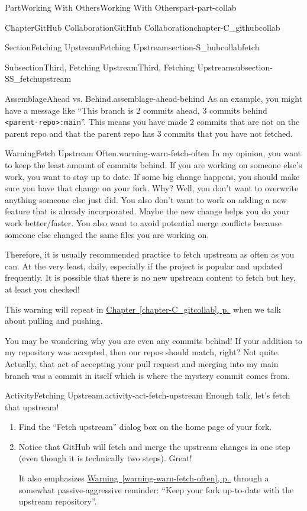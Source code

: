 \documentclass[twoside,10pt,]{book}
\newcommand{\xreffont}{\relax}
\newcommand{\mono}[1]{\texttt{#1}}
\begin{document}
\begin{partptx}{Part}{Working With Others}{}{Working With Others}{}{}{part-part-collab}
\begin{chapterptx}{Chapter}{GitHub Collaboration}{}{GitHub Collaboration}{}{}{chapter-C_githubcollab}
\begin{sectionptx}{Section}{Fetching Upstream}{}{Fetching Upstream}{}{}{section-S_hubcollabfetch}
\begin{subsectionptx}{Subsection}{Third, Fetching Upstream}{}{Third, Fetching Upstream}{}{}{subsection-SS_fetchupstream}
\begin{assemblage}{Assemblage}{Ahead vs. Behind.}{assemblage-ahead-behind}
As an example, you might have a message like ``This branch is 2 commits ahead, 3 commits behind \mono{<parent-repo>:main}''. This means you have made 2 commits that are not on the parent repo and that the parent repo has 3 commits that you have not fetched.%
\end{assemblage}
\begin{warning}{Warning}{Fetch Upstream Often.}{warning-warn-fetch-often}%
In my opinion, you want to keep the least amount of commits behind. If you are working on someone else's work, you want to stay up to date. If some big change happens, you should make sure you have that change on your fork. Why? Well, you don't want to overwrite anything someone else just did. You also don't want to work on adding a new feature that is already incorporated. Maybe the new change helps you do your work better\slash{}faster. You also want to avoid potential merge conflicts because someone else changed the same files you are working on.%
\par
Therefore, it is usually recommended practice to fetch upstream as often as you can. At the very least, daily, especially if the project is popular and updated frequently. It is possible that there is no new upstream content to fetch but hey, at least you checked!%
\par
This warning will repeat in \hyperref[chapter-C_gitcollab]{Chapter~{\xreffont\ref{chapter-C_gitcollab}}, p.\,\pageref{chapter-C_gitcollab}} when we talk about pulling and pushing.%
\end{warning}
You may be wondering why you are even any commits behind! If your addition to my repository was accepted, then our repos should match, right? Not quite. Actually, that act of accepting your pull request and merging into my main branch was a commit in itself which is where the mystery commit comes from.%
\begin{activity}{Activity}{Fetching Upstream.}{activity-act-fetch-upstream}%
Enough talk, let's fetch that upstream!%
\begin{enumerate}[font=\bfseries,label=(\alph*),ref=\alph*]%
\item{}Find the ``Fetch upstream'' dialog box on the home page of your fork.%
\item{}Notice that GitHub will fetch and merge the upstream changes in one step (even though it is technically two steps). Great!%
\par
It also emphasizes \hyperref[warning-warn-fetch-often]{Warning~{\xreffont\ref{warning-warn-fetch-often}}, p.\,\pageref{warning-warn-fetch-often}} through a somewhat passive-aggressive reminder: ``Keep your fork up-to-date with the upstream repository''.%

\end{enumerate}
\end{activity}
\end{subsectionptx}
\end{sectionptx}
\end{chapterptx}
\end{partptx}
\end{document}
